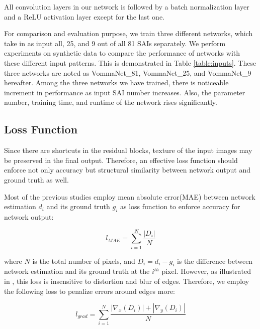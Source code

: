 \documentclass[10pt,twocolumn,letterpaper]{article}
\begin{document}
All convolution layers in our network is followed by a batch normalization layer and a ReLU activation layer except for the last one.


For comparison and evaluation purpose, we train three different networks, which take in as input all, 25, and 9 out of all 81 SAIs separately. We perform experiments on synthetic data to compare the performance of networks with these different input patterns. This is demonstrated in Table \ref{table:inputs}. These three networks are noted as VommaNet\_81, VommaNet\_25, and VommaNet\_9 hereafter. Among the three networks we have trained, there is noticeable increment in performance as input SAI number increases. Also, the parameter number, training time, and runtime of the network rises significantly.

\subsection{Loss Function}

Since there are shortcuts in the residual blocks, texture of the input images may be preserved in the final output. Therefore, an effective loss function should enforce not only accuracy but structural similarity between network output and ground truth as well.

Most of the previous studies employ mean absolute error(MAE) between network estimation $d_{i}$ and its ground truth $g_{i}$ as loss function to enforce accuracy for network output:

$$l_{MAE} = \sum_{i=1}^{N} \frac{|D_{i}|}{N}$$

where $N$ is the total number of pixels, and $D_{i}=d_{i}-g_{i}$ is the difference between network estimation and its ground truth at the $i^{th}$ pixel. However, as illustrated in \cite{hu2018revisiting}, this loss is insensitive to distortion and blur of edges. Therefore, we employ the following loss to penalize errors around edges more:

$$l_{grad} = \sum_{i=1}^{N} \frac{|\nabla_{x}(D_{i})|+|\nabla_{y}(D_{i})|}{N}$$
\end{document}
